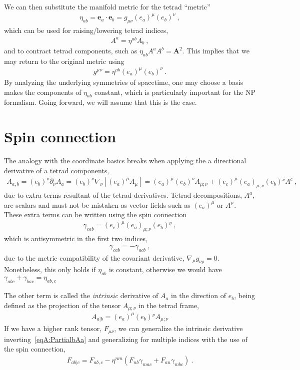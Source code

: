 We can then substitute the manifold metric for the tetrad ``metric''
\begin{align}
    \eta_{ab} = \bm{e}_a \cdot \bm{e}_b = g_{\mu\nu} (e_a)^\mu (e_b)^\nu ~,
\end{align}
which can be used for raising/lowering tetrad indices,
\begin{align}
    A^a = \eta^{ab} A_b ~,
\end{align}
and to contract tetrad components, such as $\eta_{ab} A^a A^b = \bm{A}^2$. This implies that we may return to the original metric using 
\begin{align}
    g^{\mu\nu} = \eta^{ab} (e_a)^\mu (e_b)^\nu ~.
\end{align}
By analyzing the underlying symmetries of spacetime, one may choose a basis makes the components of $\eta_{ab}$ constant, which is particularly important for the NP formalism.
Going forward, we will assume that this is the case.

\section{Spin connection}
\label{AppendixSpinConnection}

The analogy with the coordinate basics breaks when applying the a directional derivative of a tetrad components, 
\begin{align}
    A_{a,b} = (e_b)^\nu \partial_\nu A_{a} = (e_b)^\nu \nabla_\nu \left[ (e_a)^\mu A_\mu \right] = (e_a)^\mu (e_b)^\nu A_{\mu ; \nu} + (e_c)^\mu (e_a)_{\mu;\nu} (e_b){}^\nu A^c ~,
    \label{eqA:PartialbAa}
\end{align}
due to extra terms resultant of the tetrad derivatives. Tetrad decompositions, $A^a$, are scalars and must not be mistaken as vector fields such as $(e_a)^\mu$ or $A^\mu$. These extra terms can be written using the spin connection
\begin{align}
    \gamma_{cab} = (e_c)^\mu (e_a)_{\mu;\nu} (e_b){}^\nu ~,
\end{align}  
which is antisymmetric in the first two indices,
\begin{align}
    \gamma_{cab} = - \gamma_{acb} ~,
\end{align}
due to the metric compatibility of the covariant derivative, $\nabla_\mu g_{\nu\rho} = 0$.
Nonetheless, this only holds if $\eta_{ab}$ is constant, otherwise we would have $\gamma_{abc} + \gamma_{bac} = \eta_{ab,c}$

The other term is called the \emph{intrinsic} derivative of $A_a$ in the direction of $e_b$, being defined as the projection of the tensor $A_{\mu;\nu}$ in the tetrad frame,
\begin{align}
    A_{a\rvert  b} = (e_a)^\mu (e_b){}^\nu A_{\mu;\nu}
    \label{eqA:intrinsicDerA}
\end{align}
If we have a higher rank tensor, $F_{\mu\nu}$, we can generalize the intrinsic derivative inverting~\eqref{eqA:PartialbAa} and generalizing for multiple indices with the use of the spin connection,
\begin{align}
    F_{ab\rvert c} = F_{ab,c} - \eta^{nm} ( F_{nb} \gamma_{mac} + F_{an} \gamma_{mbc}) ~.
\end{align}

